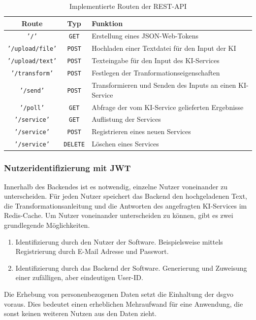 \begin{table}[H]
\centering
\begin{tabular}{c|c|l}
\textbf{Route} & \textbf{Typ} & \textbf{Funktion}\\
\hline
\texttt{'/'} & \texttt{GET} & Erstellung eines JSON-Web-Tokens\\
\hline
\texttt{'/upload/file'}  & \texttt{POST} & Hochladen einer Textdatei für den Input der KI \\
\texttt{'/upload/text'}  & \texttt{POST} & Texteingabe für den Input des KI-Services \\    
\texttt{'/transform'}  & \texttt{POST} & Festlegen der Tranformationseigenschaften\\ 
\texttt{'/send'}  & \texttt{POST} & Transformieren und Senden des Inputs an einen KI-Service \\ 
\texttt{'/poll'}  & \texttt{GET} & Abfrage der vom KI-Service gelieferten Ergebnisse \\ 
\hline
\texttt{'/service'}  & \texttt{GET} & Auflistung der Services \\
\texttt{'/service'}  & \texttt{POST} & Registrieren eines neuen Services \\ 
\texttt{'/service'}  & \texttt{DELETE} & Löschen eines Services \\       
\end{tabular}
\caption{Implementierte Routen der REST-API}
\end{table}

\subsubsection{Nutzeridentifizierung mit JWT}
Innerhalb des Backendes ist es notwendig, einzelne Nutzer voneinander zu unterscheiden. Für jeden Nutzer speichert das Backend den hochgeladenen Text, die Transformationsanleitung und die Antworten des angefragten KI-Services im Redis-Cache. Um Nutzer voneinander unterscheiden zu können, gibt es zwei grundlegende Möglichkeiten. 
\begin{enumerate}
\item Identifizierung durch den Nutzer der Software. Beispielsweise mittels Registrierung durch E-Mail Adresse und Passwort.
\item Identifizierung durch das Backend der Software. Generierung und Zuweisung einer zufälligen, aber eindeutigen User-ID.
\end{enumerate}

Die Erhebung von personenbezogenen Daten setzt die Einhaltung der \ac{dsgvo} voraus. Dies bedeutet einen erheblichen Mehraufwand für eine Anwendung, die sonst keinen weiteren Nutzen aus den Daten zieht.

